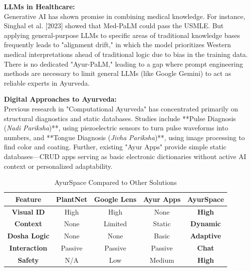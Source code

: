 \documentclass[12pt, a4paper]{report}
\begin{document}
\vspace{5mm}

\item \textbf{LLMs in Healthcare:}\\
Generative AI has shown promise in combining medical knowledge. For instance, Singhal et al. [2023] showed that Med-PaLM could pass the USMLE. But applying general-purpose LLMs to specific areas of traditional knowledge bases frequently leads to "alignment drift," in which the model prioritizes Western medical interpretations ahead of traditional logic due to bias in the training data. There is no dedicated "Ayur-PaLM," leading to a gap where prompt engineering methods are necessary to limit general LLMs (like Google Gemini) to act as reliable experts in Ayurveda.
\vspace{5mm}

\item \textbf{Digital Approaches to Ayurveda:}\\
Previous research in "Computational Ayurveda" has concentrated primarily on structural diagnostics and static databases. Studies include **Pulse Diagnosis (\textit{Nadi Pariksha})**, using piezoelectric sensors to turn pulse waveforms into numbers, and **Tongue Diagnosis (\textit{Jivha Pariksha})**, using image processing to find color and coating. Further, existing "Ayur Apps" provide simple static databases—CRUD apps serving as basic electronic dictionaries without active AI context or personalized adaptability.
\vspace{5mm}

\begin{table}[htbp]
\caption{AyurSpace Compared to Other Solutions}
\begin{center}
\begin{tabular}{|c|c|c|c|c|}
\hline
\textbf{Feature} & \textbf{PlantNet} & \textbf{Google Lens} & \textbf{Ayur Apps} & \textbf{AyurSpace} \\
\hline
\textbf{Visual ID} & High & High & None & \textbf{High} \\
\hline
\textbf{Context} & None & Limited & Static & \textbf{Dynamic} \\
\hline
\textbf{Dosha Logic} & None & None & Basic & \textbf{Adaptive} \\
\hline
\textbf{Interaction} & Passive & Passive & Passive & \textbf{Chat} \\
\hline
\textbf{Safety} & N/A & Low & Medium & \textbf{High} \\
\hline
\end{tabular}
\label{tab1}
\end{center}
\end{table}
\end{document}
